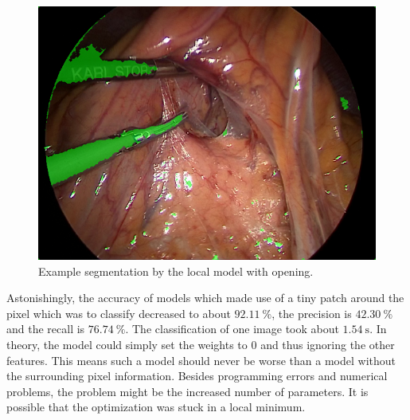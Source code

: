 \begin{figure}[t]
    \centering
    \includegraphics[width=\linewidth]{images/model-303-img_06_raw-overlay.png}
    \caption{Example segmentation by the local model with opening.}
    \label{fig:model-303-segmentation}
\end{figure}

Astonishingly, the accuracy of models which made use of a tiny patch around the
pixel which was to classify decreased to about $\SI{92.11}{\percent}$, the
precision is $\SI{42.30}{\percent}$ and the recall is $\SI{76.74}{\percent}$.
The classification of one image took about $\SI{1.54}{\second}$. In theory, the
model could simply set the weights to 0 and thus ignoring the other features.
This means such a model should never be worse than a model without the
surrounding pixel information. Besides programming errors and numerical
problems, the problem might be the increased number of parameters. It is
possible that the optimization was stuck in a local minimum.


